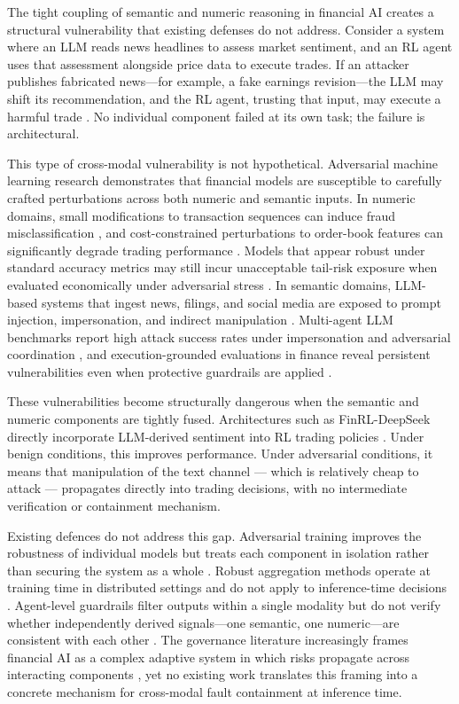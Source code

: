 The tight coupling of semantic and numeric reasoning in financial AI creates a structural vulnerability that existing defenses do not address. Consider a system where an LLM reads news headlines to assess market sentiment, and an RL agent uses that assessment alongside price data to execute trades. If an attacker publishes fabricated news---for example, a fake earnings revision---the LLM may shift its recommendation, and the RL agent, trusting that input, may execute a harmful trade \cite{yang_finvault_2026, 10.1093/rof/rfac058}. No individual component failed at its own task; the failure is architectural.

This type of cross-modal vulnerability is not hypothetical. Adversarial machine learning research demonstrates that financial models are susceptible to carefully crafted perturbations across both numeric and semantic inputs. In numeric domains, small modifications to transaction sequences can induce fraud misclassification \cite{fursov_adversarial_2021}, and cost-constrained perturbations to order-book features can significantly degrade trading performance \cite{goldblum_adversarial_2021}. Models that appear robust under standard accuracy metrics may still incur unacceptable tail-risk exposure when evaluated economically under adversarial stress \cite{baviskar2025robust}. In semantic domains, LLM-based systems that ingest news, filings, and social media are exposed to prompt injection, impersonation, and indirect manipulation \cite{vassilev2023nist}. Multi-agent LLM benchmarks report high attack success rates under impersonation and adversarial coordination \cite{kavathekar2025tamas}, and execution-grounded evaluations in finance reveal persistent vulnerabilities even when protective guardrails are applied \cite{yang_finvault_2026}.

These vulnerabilities become structurally dangerous when the semantic and numeric components are tightly fused. Architectures such as FinRL-DeepSeek directly incorporate LLM-derived sentiment into RL trading policies \cite{benhenda2025finrl}. Under benign conditions, this improves performance. Under adversarial conditions, it means that manipulation of the text channel — which is relatively cheap to attack — propagates directly into trading decisions, with no intermediate verification or containment mechanism.

Existing defences do not address this gap. Adversarial training improves the robustness of individual models but treats each component in isolation rather than securing the system as a whole \cite{madry_towards_2019}. Robust aggregation methods operate at training time in distributed settings and do not apply to inference-time decisions \cite{allouah_fixing_2023}. Agent-level guardrails filter outputs within a single modality but do not verify whether independently derived signals---one semantic, one numeric---are consistent with each other \cite{xiang_alrphfs_2025}. The governance literature increasingly frames financial AI as a complex adaptive system in which risks propagate across interacting components \cite{kurshan_agentic_2025, chen_standard_2025}, yet no existing work translates this framing into a concrete mechanism for cross-modal fault containment at inference time.


